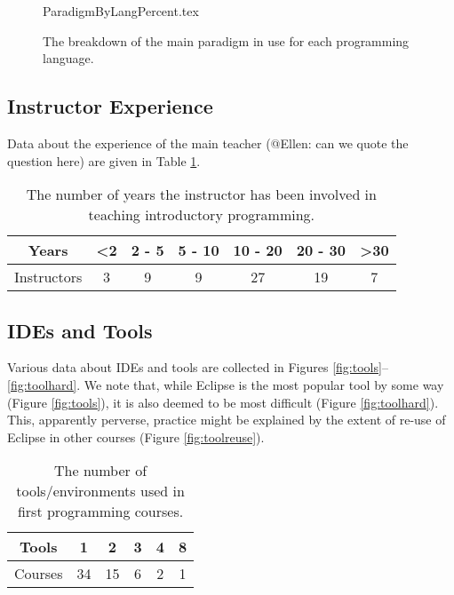 \documentclass{sig-alternate}
\begin{document}
%


\begin{figure}
\begin{center}
{ParadigmByLangPercent.tex}
\end{center}\vskip-18pt
\caption{The breakdown of the main paradigm in use for each programming language.}
\end{figure}

\subsection{Instructor Experience}
Data about the experience of the main teacher (@Ellen: can we quote the question here) are given in Table \ref{tab:yearsTeaching}.
\begin{table}[]
\centering
\caption{The number of years the instructor has been involved in teaching introductory programming.}
\label{tab:yearsTeaching}
\begin{tabular}{ccccccc}
\hline
Years       & \textless 2 & 2 - 5 & 5 - 10 & 10 - 20 & 20 - 30 & \textgreater 30 \\ \hline
Instructors & 3          & 9     & 9      & 27      & 19      & 7              \\ \hline
\end{tabular}
\end{table}

\subsection{IDEs and Tools}
Various data about IDEs and tools are collected in Figures \ref{fig:tools}--\ref{fig:toolhard}. We note that, while Eclipse is the most popular tool by some way (Figure \ref{fig:tools}), it is also deemed to be most difficult (Figure \ref{fig:toolhard}). This, apparently perverse, practice might be explained by the extent of re-use of Eclipse in other courses (Figure \ref{fig:toolreuse}).
\begin{table}[]
\centering
\caption{The number of tools/environments used in first programming courses.}
\label{tab:numTools}
\begin{tabular}{cccccc}
\hline
Tools   & 1  & 2  & 3 & 4 & 8 \\ \hline
Courses & 34 & 15 & 6 & 2 & 1 \\ \hline
\end{tabular}
\end{table}
\end{document}
